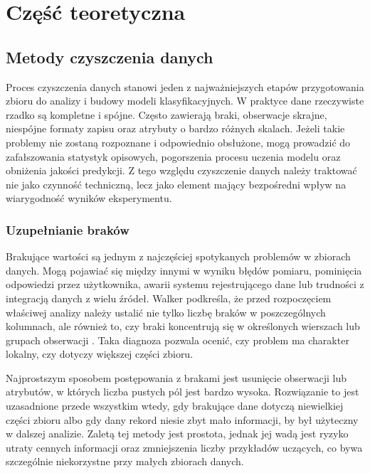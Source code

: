 \chapter{Część teoretyczna}

{%


\section{Metody czyszczenia danych}
Proces czyszczenia danych stanowi jeden z najważniejszych etapów przygotowania zbioru do analizy i budowy modeli klasyfikacyjnych. W praktyce dane rzeczywiste rzadko są kompletne i spójne. Często zawierają braki, obserwacje skrajne, niespójne formaty zapisu oraz atrybuty o bardzo różnych skalach. Jeżeli takie problemy nie zostaną rozpoznane i odpowiednio obsłużone, mogą prowadzić do zafałszowania statystyk opisowych, pogorszenia procesu uczenia modelu oraz obniżenia jakości predykcji. Z tego względu czyszczenie danych należy traktować nie jako czynność techniczną, lecz jako element mający bezpośredni wpływ na wiarygodność wyników eksperymentu.

\subsection{Uzupełnianie braków}
Brakujące wartości są jednym z najczęściej spotykanych problemów w zbiorach danych. Mogą pojawiać się między innymi w wyniku błędów pomiaru, pominięcia odpowiedzi przez użytkownika, awarii systemu rejestrującego dane lub trudności z integracją danych z wielu źródeł. Walker podkreśla, że przed rozpoczęciem właściwej analizy należy ustalić nie tylko liczbę braków w poszczególnych kolumnach, ale również to, czy braki koncentrują się w określonych wierszach lub grupach obserwacji \cite{Walker2021}. Taka diagnoza pozwala ocenić, czy problem ma charakter lokalny, czy dotyczy większej części zbioru.

Najprostszym sposobem postępowania z brakami jest usunięcie obserwacji lub atrybutów, w których liczba pustych pól jest bardzo wysoka. Rozwiązanie to jest uzasadnione przede wszystkim wtedy, gdy brakujące dane dotyczą niewielkiej części zbioru albo gdy dany rekord niesie zbyt mało informacji, by był użyteczny w dalszej analizie. Zaletą tej metody jest prostota, jednak jej wadą jest ryzyko utraty cennych informacji oraz zmniejszenia liczby przykładów uczących, co bywa szczególnie niekorzystne przy małych zbiorach danych.

}

